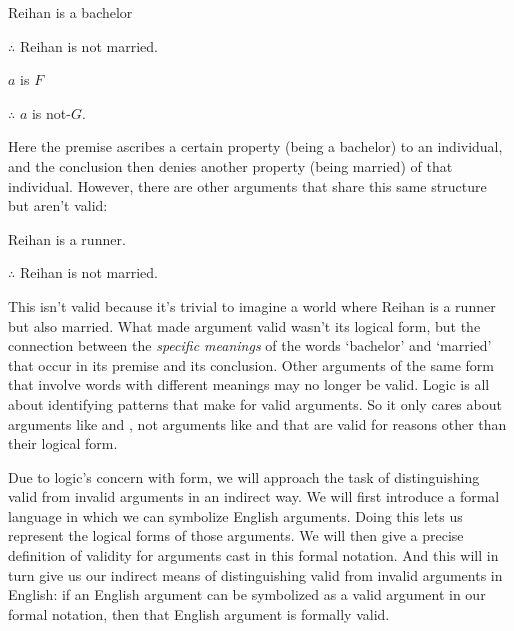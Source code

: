 \begin{multicols}{2}

\begin{earg}
\item[\eref{exarg6}] Reihan is a bachelor
\item[] $\therefore$ Reihan is not married.
\end{earg}

\columnbreak

\begin{earg}
\item[] $a$ is $F$
\item[] $\therefore$ $a$ is not-$G$.
\end{earg}
\end{multicols}
\noindent Here the premise ascribes a certain property (being a bachelor) to an individual, and the conclusion then denies another property (being married) of that individual. However, there are other arguments that share this same structure but aren't valid:
\begin{earg}
\item[] Reihan is a runner.
\item[] $\therefore$ Reihan is not married.
\end{earg}
This isn't valid because it's trivial to imagine a world where Reihan is a runner but also married.  What made argument  valid wasn't its logical form, but the connection between the  \emph{specific meanings} of the words `bachelor' and `married' that occur in its premise and its conclusion. Other arguments of the same form that involve words with different meanings may no longer be valid. Logic is all about identifying patterns that make for valid arguments.  So it only cares about  arguments like  and , not arguments like  and  that are valid for reasons other than their logical form. 



Due to logic's concern with form, we will approach the task of distinguishing valid from invalid arguments in an indirect way. We will first introduce a formal language in which we can symbolize English arguments.  Doing this lets us represent the logical forms of those arguments.  We will then give a precise definition of validity for arguments cast in this formal notation.  And this will in turn give us our indirect means of distinguishing valid from invalid arguments in English: if an English argument can be symbolized as a valid argument in our formal notation, then that English argument is formally valid.

